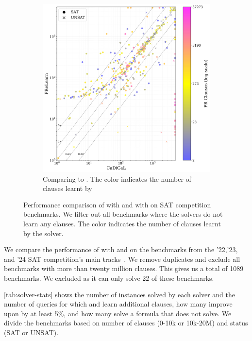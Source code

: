 \begin{figure}[!t]
\begin{subfigure}[t]{0.45\textwidth}
        \includegraphics[width=\textwidth]{figs/cadical_vs_prelearn_nontrivial.jpg}
        \caption{Comparing \prelearn to \cadical. The color indicates the number of \pr clauses learnt by \prelearn}
        \label{fig:cautical-vs-prelearn}
    \end{subfigure}
    \caption{Performance comparison of \tool with and \prelearn with \cadical on SAT competition benchmarks. We filter out all benchmarks where the solvers do not learn any \pr clauses. The color indicates the number of \pr clauses learnt by the solver.}
    \label{fig:solver-comparison}
\end{figure}

We compare the performance of \tool with \cadical and \prelearn on the benchmarks from the '22,'23, and '24 SAT competition's main tracks~\cite{satcomp2022,satcomp2023,satcomp2024}. We remove duplicates and  exclude all benchmarks with more than twenty million clauses. This gives us a total of 1089 benchmarks. We excluded \sadical as it can only solve 22 of these benchmarks.

\autoref{tab:solver-stats} shows the number of instances solved by each solver and the number of queries for which \prelearn and \cadical learn additional \pr clauses, how many improve upon \cadical by at least 5\%, and how many solve a formula that \cadical does not solve. We divide the benchmarks based on number of clauses (0-10k or 10k-20M) and status (SAT or UNSAT).

